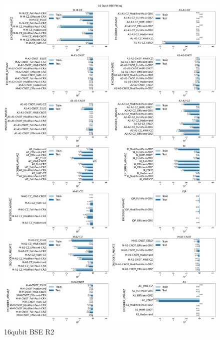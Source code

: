 \documentclass[journal=jacsat,manuscript=article]{achemso}
\begin{document}
\begin{figure}[H]
	\centering
	\includegraphics[width=0.8\linewidth]{images/16qubit_BSE_R2.png}
	\caption{16qubit BSE R2}
	\label{fig:16qubit_BSE_R2}
\end{figure}
\end{document}
